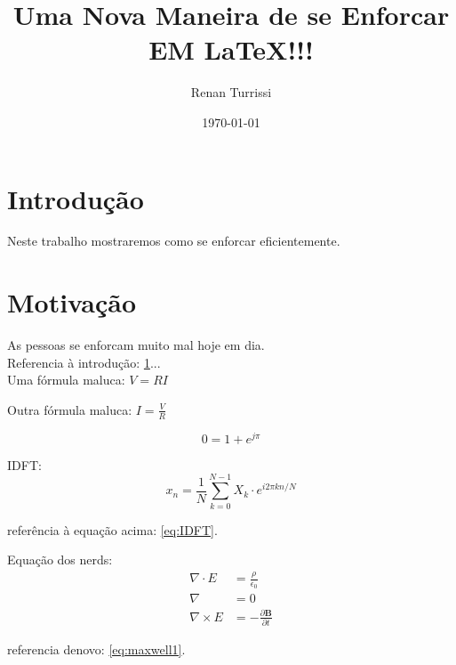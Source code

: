 \documentclass{article}
\author{Renan Turrissi}
\date{\today}
\title{Uma Nova Maneira de se Enforcar EM \LaTeX !!!}
\newcommand{\vetor}[1]{\textbf{#1}}
\begin{document}
\maketitle

\newpage

\section{Introdução}\label{sec:intro}
Neste trabalho mostraremos como se enforcar eficientemente.

\section{Motivação}\label{sec:motiv}
As pessoas se enforcam muito mal hoje em dia.\\
Referencia à introdução: \ref{sec:intro}...\\
Uma fórmula maluca: $ V =RI $   

\hfill

Outra fórmula maluca: $ I = \frac{V}{R} $

$$ 0 = 1+e^{j\pi}  $$

IDFT: 
\begin{equation} \label{eq:IDFT}
 x_n = \frac{1}{N}\sum_{k=0}^{N-1} X_k \cdot e^{i2\pi kn/N} 
\end{equation}

referência à equação acima: \ref{eq:IDFT}.

Equação dos nerds:
\begin{align}
\label{eq:maxwell1}
\nabla \cdot E & = \frac{\rho}{\epsilon_0} \\
\nabla  & = 0 \\
\nabla \times E & = -\frac{\partial \vetor{B}}{\partial t}
\end{align}

referencia denovo: \ref{eq:maxwell1}.
\end{document}
